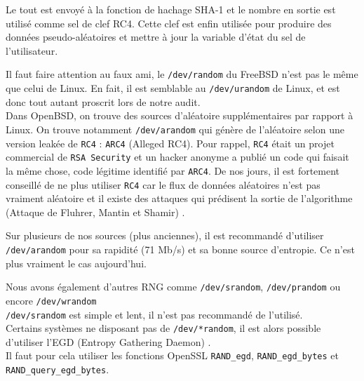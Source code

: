 			Le tout est envoyé à la fonction de hachage SHA-1 et le nombre en 
			sortie est utilisé comme sel de clef RC4.  
			Cette clef est enfin utilisée pour produire des données 
			pseudo-aléatoires et mettre à jour la variable d'état du sel de 
			l'utilisateur. 
			
			
			Il faut faire attention au faux ami, le \texttt{/dev/random} 
			du FreeBSD n'est pas le même que celui de Linux.
			En fait, il est semblable au \texttt{/dev/urandom} de Linux, 
			et est donc tout autant proscrit lors de notre audit.\\
			
			Dans OpenBSD, on trouve des sources d'aléatoire supplémentaires 
			par rapport à Linux. On trouve notamment \texttt{/dev/arandom} qui 
			génère de l'aléatoire selon une version leakée de \texttt{RC4} :
			\texttt{ARC4} (Alleged RC4). Pour rappel, \texttt{RC4} était 
			un projet commercial de \texttt{RSA Security} et un hacker 
			anonyme a publié un code qui faisait la même chose, 
			code légitime identifié par \texttt{ARC4}. 
			De nos jours, il est fortement conseillé de ne plus utiliser
			\texttt{RC4} car le flux de données aléatoires n'est pas vraiment 
			aléatoire et il existe des attaques qui prédisent la sortie de 
			l'algorithme (Attaque de Fluhrer, Mantin et Shamir) 
			\nocite{Fluhrer01weaknessesin}.	
			
			Sur plusieurs de nos sources (plus anciennes), il est recommandé
			d'utiliser \texttt{/dev/arandom} pour sa rapidité 
			(71 Mb/s) et sa bonne source d'entropie. 
			Ce n'est plus vraiment le cas aujourd'hui.\\

	
		
			Nous avons également d'autres RNG comme \texttt{/dev/srandom},
			\texttt{/dev/prandom} ou encore \texttt{/dev/wrandom}
			\cite{miros2013}\\
			
			\texttt{/dev/srandom} est simple et lent, il n'est pas recommandé de 
			l'utilisé.\\
		
			Certains systèmes ne disposant pas de \texttt{/dev/*random}, 
			il est alors possible d'utiliser l'EGD (Entropy Gathering Daemon) 
			\cite{egdsf.net}.\\
			
			Il faut pour cela utiliser les fonctions OpenSSL \texttt{RAND\_egd}, 
			\texttt{RAND\_egd\_bytes} et \texttt{RAND\_query\_egd\_bytes}. \\


